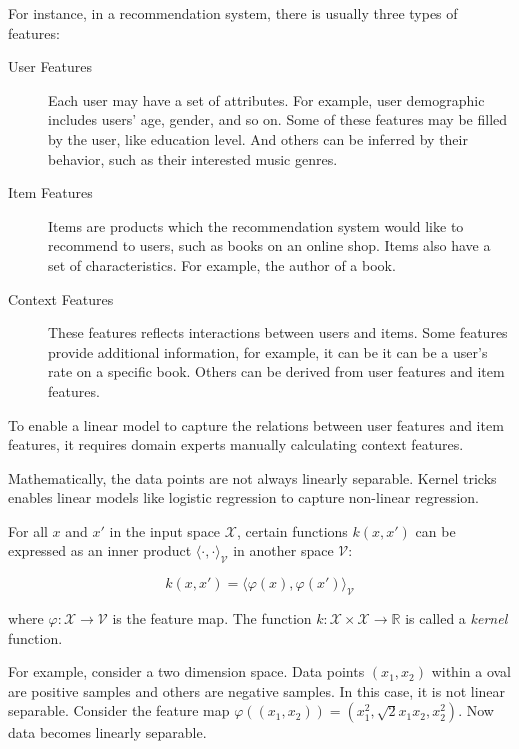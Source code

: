        For instance, in a recommendation system, there is usually three types of features: \cite{Ricci2011}

        \begin{description}
            \item[User Features] Each user may have a set of attributes.
                For example, user demographic includes users' age, gender, and so on.
                Some of these features may be filled by the user, like education level.
                And others can be inferred by their behavior, such as their interested music genres.
            \item[Item Features] Items are products which the recommendation system would like to recommend to users,
                such as books on an online shop.
                Items also have a set of characteristics.
                For example, the author of a book.
            \item[Context Features] These features reflects interactions between users and items.
                Some features provide additional information,
                for example, it can be it can be a user's rate on a specific book.
                Others can be derived from user features and item features.
        \end{description}

        To enable a linear model to capture the relations between user features and item features,
        it requires domain experts manually calculating context features.

        Mathematically, the data points are not always linearly separable.
        Kernel tricks enables linear models like logistic regression to capture non-linear regression.

        For all $x$ and $x'$ in the input space $\mathcal{X}$,
        certain functions $k(x, x')$ can be expressed as an inner product $\langle\cdot,\cdot\rangle_{\mathcal{V}}$
        in another space $\mathcal{V}$:

        \[
        k(x, x') = \langle \varphi(x), \varphi(x') \rangle_{\mathcal{V}}
        \]

        where $\varphi: \mathcal{X} \rightarrow \mathcal{V}$ is the feature map.
        The function $k: \mathcal{X} \times \mathcal{X} \rightarrow \mathbb{R}$ is called a \emph{kernel} function.

        For example, consider a two dimension space.
        Data points $(x_1, x_2)$ within a oval are positive samples and others are negative samples.
        In this case, it is not linear separable.
        Consider the feature map $\varphi((x_1, x_2)) = (x_1^2, \sqrt{2}x_1x_2, x_2^2)$.
        Now data becomes linearly separable. \cite{Rai2011}

